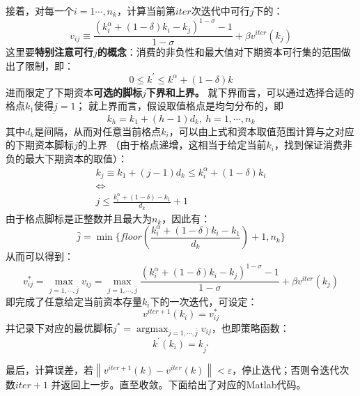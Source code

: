 \begin{example}
    接着，对每一个$i=1\cdots,n_k$，计算当前第$iter$次迭代中可行$j$下的：
    \begin{equation*}
        v_{ij} \equiv \frac{\left(k_i^{\alpha}+\left(1-\delta\right)k_i-k_j\right)^{1-\sigma}-1}{1-\sigma} + 
            \beta v^{iter}(k_j)
    \end{equation*}
    这里要\textbf{特别注意可行$j$的概念}：消费的非负性和最大值对下期资本可行集的范围做出了限制，即：
    \begin{equation*}
        0\leq k^{\prime} \leq k^{\alpha}+(1-\delta)k
    \end{equation*}
    进而限定了下期资本\textbf{可选的脚标$j$下界和上界。}
    就下界而言，可以通过选择合适的格点$k_1$使得$\underbar{j}=1$；
    就上界而言，假设取值格点是均匀分布的，即
    \begin{equation*}
        k_h=k_1+(h-1)d_k,~h=1,\cdots,n_k
    \end{equation*}
    其中$d_k$是间隔，从而对任意当前格点$k_i$，可以由上式和资本取值范围计算与之对应的下期资本脚标$j$的上界
    （由于格点递增，这相当于给定当前$k_i$，找到保证消费非负的最大下期资本的取值）：
    \begin{equation*}
        \begin{aligned}
            k_j\equiv k_1+(j-1)d_k \leq k_i^{\alpha}+(1-\delta)k_i \\
            \Leftrightarrow \\
            j \leq \frac{k_i^{\alpha}+(1-\delta)-k_1}{d_k} + 1
        \end{aligned}
    \end{equation*}
    由于格点脚标是正整数并且最大为$n_k$，因此有：
    \begin{equation*}
        \bar{j} = \min \{floor({\frac{k_i^{\alpha}+(1-\delta)k_i-k_{1}}{d_k}})+1,n_k\}
    \end{equation*}
    从而可以得到：
    \begin{equation*}
        v_{ij}^* = \max_{j=1,\cdots,\bar{j}} v_{ij} = \max_{j=1,\cdots,\bar{j}}
            \frac{\left(k_i^{\alpha}+\left(1-\delta\right)k_i-k_j\right)^{1-\sigma}-1}{1-\sigma} + 
                \beta v^{iter}(k_j)
    \end{equation*}
    即完成了任意给定当前资本存量$k_i$下的一次迭代，可设定：
    \begin{equation*}
        v^{iter+1}(k_i) = v_{ij}^*
    \end{equation*}
    并记录下对应的最优脚标$j^* = \operatorname{argmax}_{j=1,\cdots,\bar{j}}v_{ij}$，也即策略函数：
    \begin{equation*}
        k^{\prime}(k_i) = k_{j^*}
    \end{equation*}

    最后，计算误差，若$\left\|v^{iter+1}(k)-v^{iter}(k)\right\|<\varepsilon$，停止迭代；否则令迭代次数$iter+1$
    并返回上一步。直至收敛。下面给出了对应的Matlab代码。
\end{example}

